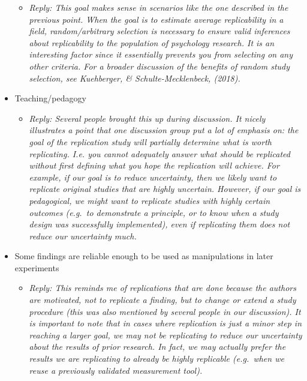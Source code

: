 \documentclass[
]{article}
\providecommand{\tightlist}{%
  \setlength{\itemsep}{0pt}\setlength{\parskip}{0pt}}
\begin{document}
\begin{itemize}
  \begin{itemize}
  \tightlist
  \item
    \emph{Reply: This goal makes sense in scenarios like the one
    described in the previous point. When the goal is to estimate
    average replicability in a field, random/arbitrary selection is
    necessary to ensure valid inferences about replicability to the
    population of psychology research. It is an interesting factor since
    it essentially prevents you from selecting on any other criteria.
    For a broader discussion of the benefits of random study selection,
    see Kuehberger, \& Schulte-Mecklenbeck, (2018). }
  \end{itemize}
\item
  Teaching/pedagogy

  \begin{itemize}
  \tightlist
  \item
    \emph{Reply: Several people brought this up during discussion. It
    nicely illustrates a point that one discussion group put a lot of
    emphasis on: the goal of the replication study will partially
    determine what is worth replicating. I.e. you cannot adequately
    answer what should be replicated without first defining what you
    hope the replication will achieve. For example, if our goal is to
    reduce uncertainty, then we likely want to replicate original
    studies that are highly uncertain. However, if our goal is
    pedagogical, we might want to replicate studies with highly certain
    outcomes (e.g.~to demonstrate a principle, or to know when a study
    design was successfully implemented), even if replicating them does
    not reduce our uncertainty much.}
  \end{itemize}
\item
  Some findings are reliable enough to be used as manipulations in later
  experiments

  \begin{itemize}
  \tightlist
  \item
    \emph{Reply: This reminds me of replications that are done because
    the authors are motivated, not to replicate a finding, but to change
    or extend a study procedure (this was also mentioned by several
    people in our discussion). It is important to note that in cases
    where replication is just a minor step in reaching a larger goal, we
    may not be replicating to reduce our uncertainty about the results
    of prior research. In fact, we may actually prefer the results we
    are replicating to already be highly replicable (e.g.~when we reuse
    a previously validated measurement tool). }
  \end{itemize}
\end{itemize}
\end{document}
